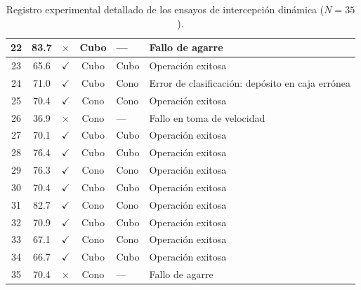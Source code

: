 \documentclass[12pt, a4paper]{report}
\begin{document}
\begin{table}[H]
\begin{tabular}{|c|c|c|c|l|p{5.0cm}|}
22 & 83.7  & $\times$     & Cubo     & ---  & Fallo de agarre \\ \hline
23 & 65.6  & $\checkmark$ & Cubo & Cubo & Operación exitosa \\ \hline
24 & 71.0  & $\checkmark$ & Cubo     & Cono & Error de clasificación: depósito en caja errónea \\ \hline
25 & 70.4  & $\checkmark$ & Cono & Cono & Operación exitosa \\ \hline
26 & 36.9  & $\times$     & Cono     & ---  & Fallo en toma de velocidad \\ \hline
27 & 70.1  & $\checkmark$ & Cubo & Cubo & Operación exitosa \\ \hline
28 & 76.4  & $\checkmark$ & Cubo & Cubo & Operación exitosa \\ \hline
29 & 76.3  & $\checkmark$ & Cono & Cono & Operación exitosa \\ \hline
30 & 70.4  & $\checkmark$ & Cubo & Cubo & Operación exitosa \\ \hline
31 & 82.7  & $\checkmark$ & Cono & Cono & Operación exitosa \\ \hline
32 & 70.9  & $\checkmark$ & Cubo & Cubo & Operación exitosa \\ \hline
33 & 67.1  & $\checkmark$ & Cono & Cono & Operación exitosa \\ \hline
34 & 66.7  & $\checkmark$ & Cubo & Cubo & Operación exitosa \\ \hline
35 & 70.4  & $\times$     & Cono    & ---  & Fallo de agarre \\ \hline
\end{tabular}
\caption{Registro experimental detallado de los ensayos de intercepción dinámica ($N = 35$).}
\label{tab:registro_dinamico_completo}
\end{table}
\end{document}
